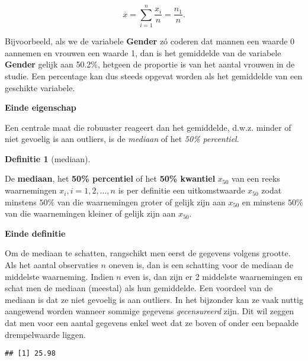 \documentclass[
  12pt,dutch,coursenotes]{book}
\newenvironment{Shaded}{\begin{snugshade}}{\end{snugshade}}
\newcommand{\DataTypeTok}[1]{\textcolor[rgb]{0.13,0.29,0.53}{#1}}
\newcommand{\KeywordTok}[1]{\textcolor[rgb]{0.13,0.29,0.53}{\textbf{#1}}}
\newcommand{\NormalTok}[1]{#1}
\newcommand{\OperatorTok}[1]{\textcolor[rgb]{0.81,0.36,0.00}{\textbf{#1}}}
\newcommand{\OtherTok}[1]{\textcolor[rgb]{0.56,0.35,0.01}{#1}}
\theoremstyle{definition}
\newtheorem{definition}{Definitie}[chapter]
\theoremstyle{definition}
\theoremstyle{definition}
\theoremstyle{remark}
\begin{document}
\begin{equation*}
\overline{x}= \sum_{i=1}^n \frac{x_i}{n} = \frac{n_1}{n}.
\end{equation*}

Bijvoorbeeld, als we de variabele \textbf{Gender} zó
coderen dat mannen een waarde 0 aannemen en vrouwen een waarde 1, dan is het
gemiddelde van de variabele \textbf{Gender} gelijk aan 50.2\%, hetgeen de proportie is van het aantal vrouwen in de studie. Een percentage kan dus
steeds opgevat worden als het gemiddelde van een geschikte variabele.

\textbf{Einde eigenschap}

Een centrale maat die robuuster reageert dan het gemiddelde, d.w.z. minder
of niet gevoelig is aan outliers, is de \emph{mediaan} of het \emph{50\% percentiel}.

\begin{definition}[mediaan]
\protect\hypertarget{def:unnamed-chunk-95}{}{\label{def:unnamed-chunk-95} \iffalse (mediaan) \fi{} }
\end{definition}
De \textbf{mediaan}, het \textbf{50\% percentiel} of het \textbf{50\%
kwantiel} \(x_{50}\) van een reeks waarnemingen \(x_i, i=1, 2, \dots, n\) is per
definitie een uitkomstwaarde \(x_{50}\) zodat minstens \(50\%\) van die
waarnemingen groter of gelijk zijn aan \(x_{50}\) en minstens \(50\%\) van die
waarnemingen kleiner of gelijk zijn aan \(x_{50}\).

\textbf{Einde definitie}

Om de mediaan te schatten, rangschikt men eerst de gegevens volgens grootte.
Als het aantal observaties \(n\) oneven is, dan is een schatting voor de
mediaan de middelste waarneming. Indien \(n\) even is, dan zijn er 2 middelste
waarnemingen en schat men de mediaan (meestal) als hun gemiddelde. Een
voordeel van de mediaan is dat ze niet gevoelig is aan outliers. In het bijzonder kan
ze vaak nuttig aangewend worden wanneer sommige gegevens \emph{gecensureerd}
zijn. Dit wil zeggen dat men voor een aantal gegevens enkel weet dat ze
boven of onder een bepaalde drempelwaarde liggen.

\begin{Shaded}
\end{Shaded}

\begin{verbatim}
## [1] 25.98
\end{verbatim}
\end{document}
